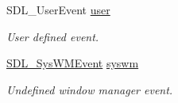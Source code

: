 \begin{DoxyCompactItemize}
SDL\_\-UserEvent \hyperlink{struct_tao_1_1_sdl_1_1_s_d_l___event_a27264207ca37b28d89b2b82af49108f1}{user}
\begin{DoxyCompactList}\small\item\em User defined event. \item\end{DoxyCompactList}\item 
\hyperlink{struct_tao_1_1_sdl_1_1_s_d_l___sys_w_m_event}{SDL\_\-SysWMEvent} \hyperlink{struct_tao_1_1_sdl_1_1_s_d_l___event_ad2a3a527da90db6ab869bb6d811c222e}{syswm}
\begin{DoxyCompactList}\small\item\em Undefined window manager event. \item\end{DoxyCompactList}\end{DoxyCompactItemize}


